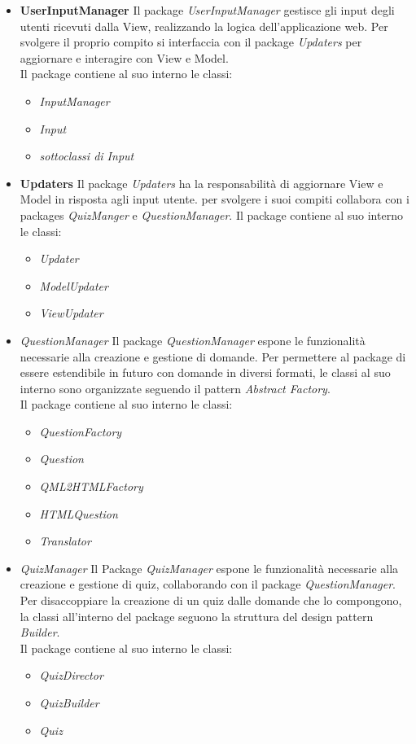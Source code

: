 \documentclass[a4paper,11pt]{article}
\begin{document}
	\begin{itemize}
	\item \textbf{UserInputManager}
	Il package \emph{UserInputManager} gestisce gli input degli utenti ricevuti dalla View, realizzando la logica dell'applicazione web. Per svolgere il proprio compito si interfaccia con il package \emph{Updaters} per aggiornare e interagire con View e Model. \\
	Il package contiene al suo interno le classi:
	\begin{itemize}
		\item \textit{InputManager}
		\item \textit{Input}
		\item \textit{sottoclassi di Input}
	\end{itemize}
	
	\item \textbf{Updaters}
	Il package \emph{Updaters} ha la responsabilità di aggiornare View e Model in risposta agli input utente. per svolgere i suoi compiti collabora con i packages \emph{QuizManger} e \emph{QuestionManager}. Il package contiene al suo interno le classi:
	\begin{itemize}
		\item \textit{Updater}
		\item \textit{ModelUpdater}
		\item \textit{ViewUpdater}
	\end{itemize}
	
	\item \textit{QuestionManager}
	Il package \emph{QuestionManager} espone le funzionalità necessarie alla creazione e gestione di domande. Per permettere al package di essere estendibile in futuro con domande in diversi formati, le classi al suo interno sono organizzate seguendo il pattern \emph{Abstract Factory}. \\
	Il package contiene al suo interno le classi:
	\begin{itemize}
		\item \textit{QuestionFactory}
		\item \textit{Question}
		\item \textit{QML2HTMLFactory}
		\item \textit{HTMLQuestion}
		\item \textit{Translator}
	\end{itemize}
	
	\item\textit{QuizManager}
	Il Package \emph{QuizManager} espone le funzionalità necessarie alla creazione e gestione di quiz, collaborando con il package \emph{QuestionManager}. Per disaccoppiare la creazione di un quiz dalle domande che lo compongono, la classi all'interno del package seguono la struttura del design pattern \emph{Builder}.\\ 
	Il package contiene al suo interno le classi:
	\begin{itemize}
		\item \textit{QuizDirector}
		\item \textit{QuizBuilder}
		\item \textit{Quiz}
	\end{itemize}
	

\end{itemize}
\end{document}
